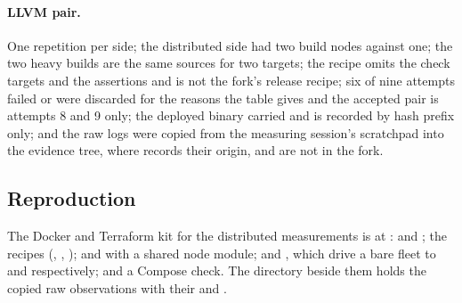 \paragraph{LLVM pair.}
One repetition per side; the distributed side had two build nodes against
one; the two heavy builds are the same sources for two targets; the recipe
omits the check targets and the assertions and is not the fork's release
recipe; six of nine attempts failed or were discarded for the reasons the table gives
and the accepted pair is attempts 8 and 9 only; the deployed binary carried
 and is recorded by hash prefix only; and the raw
logs were copied from the measuring session's scratchpad into the evidence
tree, where  records their origin, and are not in the
fork.

\subsection{Reproduction}
\label{sec:eval:repro}

The Docker and Terraform kit for the distributed measurements is at
:  and
; the  recipes (,
, );  and
 with a shared node module; 
and , which drive a bare fleet to
 and  respectively; and a
 Compose check. The  directory beside them
holds the copied raw observations with their  and
.

